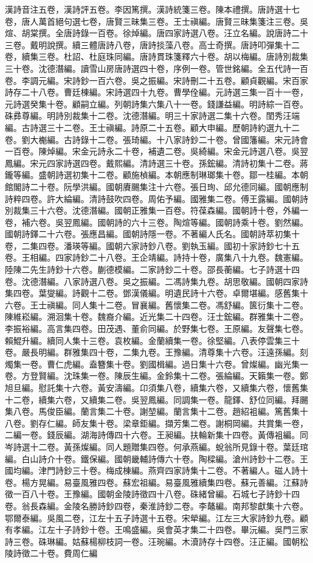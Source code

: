\begin{pinyinscope}
漢詩音注五卷，漢詩評五卷。李因篤撰。漢詩統箋三卷。陳本禮撰。唐詩選十七卷，唐人萬首絕句選七卷，唐賢三昧集三卷。王士禛編。唐賢三昧集箋注三卷。吳煊、胡棠撰。全唐詩錄一百卷。徐焯編。唐四家詩選八卷。汪立名編。說唐詩二十三卷。戴明說撰。續三體唐詩八卷，唐詩掞藻八卷。高士奇撰。唐詩叩彈集十二卷，續集三卷。杜詔、杜庭珠同編。唐詩貫珠箋釋六十卷。胡以梅編。唐詩別裁集三十卷。沈德潛編。讀雪山房唐詩選四十卷，序例一卷。管世銘編。全五代詩一百卷。李調元編。宋詩鈔一百六卷。吳之振編。宋詩刪二十五卷。顧貞觀編。宋百家詩存二十八卷。曹廷棟編。宋詩選四十九卷。曹學佺編。元詩選三集一百十一卷，元詩選癸集十卷。顧嗣立編。列朝詩集六集八十一卷。錢謙益編。明詩綜一百卷。硃彞尊編。明詩別裁集十二卷。沈德潛編。明三十家詩選二集十六卷。閨秀汪端編。古詩選三十二卷。王士禛編。詩原二十五卷。顧大申編。歷朝詩約選九十二卷。劉大櫆編。古詩錄十二卷。張琦編。十八家詩鈔二十卷。曾國籓編。宋元詩會一百卷。陳焯編。宋金元詩永二十卷，補遺二卷。吳綺編。宋金元詩選八卷。吳翌鳳編。宋元四家詩選四卷。戴熙編。清詩選三十卷。孫鋐編。清詩初集十二卷。蔣鑨等編。盛朝詩選初集十二卷。顧施楨編。本朝應制琳瑯集十卷。鄒一桂編。本朝館閣詩二十卷。阮學洪編。國朝賡颺集注十六卷。張日珣、邱允德同編。國朝應制詩粹四卷。許大綸編。清詩鼓吹四卷。周佑予編。國雅集二卷。傅王露編。國朝詩別裁集三十六卷。沈德潛編。國朝正雅集一百卷。符葆森編。國朝詩十卷，外編一卷，補六卷。吳翌鳳編。國朝詩的六十三卷。陶煊等編。國朝詩乘十卷。劉然編。國朝詩鐸二十六卷。張應昌編。國朝詩隱一卷。不著編人氏名。國朝詩萃初集十卷，二集四卷。潘瑛等編。國朝六家詩鈔八卷。劉執玉編。國初十家詩鈔七十五卷。王相編。四家詩鈔二十八卷。王企靖編。詩持十卷，廣集八十九卷。魏憲編。陸陳二先生詩鈔十六卷。蒯德模編。二家詩鈔二十卷。邵長蘅編。七子詩選十四卷。沈德潛編。八家詩選八卷。吳之振編。二馮詩集九卷。胡思敬編。國朝四家詩集四卷。葉燮編。詩觀十二卷。鄧漢儀編。明遺民詩十六卷。卓爾堪編。感舊集十六卷。王士禛編。同人集十二卷。冒襄編。舊懷集二卷。馮舒編。篋衍集十二卷。陳維崧編。溯洄集十卷。魏裔介編。近光集二十四卷。汪士鋐編。群雅集十二卷。李振裕編。高言集四卷。田茂遇、董俞同編。於野集七卷。王原編。友聲集七卷。賴鯤升編。續同人集十三卷。袁枚編。金蘭續集一卷。徐堅編。八表停雲集三十卷。嚴長明編。群雅集四十卷，二集九卷。王豫編。清尊集十六卷。汪遠孫編。刻燭集一卷。曹仁虎編。盍簪集十卷。劉國楫編。過日集十六卷。曾燦編。幽光集一卷。方登賢編。沈珠集一卷。陳辰生編。金鈴集十二卷。張綸編。天籟集一卷。鄭旭旦編。慰託集十六卷。黃安濤編。卬須集八卷，續集六卷，又續集六卷，懷舊集十二卷，續集六卷，又續集二卷。吳翌鳳編。同調集一卷。龍鐸、舒位同編。拜颺集八卷。馬俊臣編。蘭言集二十卷。謝堃編。蘭言集十二卷。趙紹袓編。篤舊集十八卷。劉存仁編。師友集十卷。梁章鉅編。擷芳集二卷。謝桐岡編。共賞集一卷，二編一卷。錢辰編。湖海詩傳四十六卷。王昶編。扶輪新集十四卷。黃傳袓編。同岑詩選十二卷。黃孫燦編。同人題贈集四卷。何承燕編。蛻翁所見錄十卷。葉廷琯編。白山詩介十卷。鐵保編。國朝畿輔詩傳六十卷。陶樑編。滄州詩鈔十二卷。王國均編。津門詩鈔三十卷。梅成棟編。燕齊四家詩集十二卷。不著編人。磁人詩十卷。楊方晃編。易臺風雅四卷。蘇宏祖編。易臺風雅續集四卷。蘇元善編。江蘇詩徵一百八十卷。王豫編。國朝金陵詩徵四十八卷。硃緒曾編。石城七子詩鈔十四卷。翁長森編。金陵名勝詩鈔四卷，秦淮詩鈔二卷。李鼇編。南邦黎獻集十六卷。鄂爾泰編。吳風二卷，江左十五子詩選十五卷。宋犖編。江左三大家詩鈔九卷。顧有孝編。江左十子詩鈔十卷。王鳴盛編。吳會英才集二十四卷。畢沅編。吳門三家詩三卷。硃琳編。姑蘇楊柳枝詞一卷。汪琬編。木瀆詩存十四卷。汪正編。國朝松陵詩徵二十卷。費周仁編
\end{pinyinscope}

